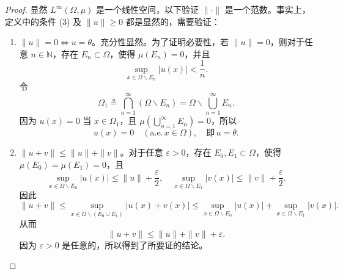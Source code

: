 \documentclass[lang=cn,newtx,10pt,scheme=chinese,thmcnt=chapter]{elegantbook}
\begin{document}
\begin{proof}
显然 $L^{\infty}(\Omega, \mu)$ 是一个线性空间，以下验证 $\|\cdot\|$ 是一个范数。事实上，定义中的条件 (3) 及 $\|u\| \geqslant 0$ 都是显然的，需要验证：
\begin{enumerate}
  \item $\|u\| = 0 \Longleftrightarrow u = \theta$。充分性显然。为了证明必要性，若 $\|u\| = 0$，则对于任意 $n \in \mathbb{N}$，存在 $E_n \subset \Omega$，使得 $\mu(E_n) = 0$，并且
  \[
  \sup_{x \in \Omega \backslash E_n} |u(x)| < \frac{1}{n}.
  \]
  令
  \[
  \Omega_1 \triangleq \bigcap_{n=1}^{\infty} (\Omega \backslash E_n) = \Omega \backslash \bigcup_{n=1}^{\infty} E_n.
  \]
  因为 $u(x) = 0$ 当 $x \in \Omega_1$，且 $\mu(\bigcup_{n=1}^{\infty} E_n) = 0$，所以
  \[
  u(x) = 0 \quad (\text{a.e.} \, x \in \Omega), \quad \text{即} \, u = \theta.
  \]
  \item $\|u + v\| \leqslant \|u\| + \|v\|$。对于任意 $\varepsilon > 0$，存在 $E_0, E_1 \subset \Omega$，使得 $\mu(E_0) = \mu(E_1) = 0$，且
  \[
  \sup_{x \in \Omega \backslash E_0} |u(x)| \leqslant \|u\| + \frac{\varepsilon}{2}, \quad \sup_{x \in \Omega \backslash E_1} |v(x)| \leqslant \|v\| + \frac{\varepsilon}{2}.
  \]
  因此
  \[
  \|u + v\| \leqslant \sup_{x \in \Omega \backslash (E_0 \cup E_1)} |u(x) + v(x)| \leqslant \sup_{x \in \Omega \backslash E_0} |u(x)| + \sup_{x \in \Omega \backslash E_1} |v(x)|.
  \]
  从而
  \[
  \|u + v\| \leqslant \|u\| + \|v\| + \varepsilon.
  \]
  因为 $\varepsilon > 0$ 是任意的，所以得到了所要证的结论。
\end{enumerate}


\end{proof}
\end{document}
